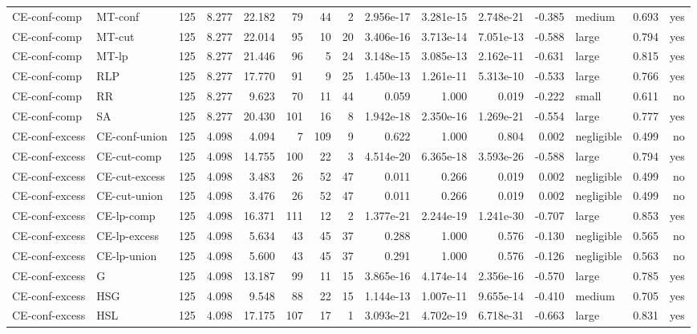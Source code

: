 \begin{table}[htbp]
\begin{tabular}{llrrrrrrrrrrlrr}
CE-conf-comp & MT-conf & 125 & 8.277 & 22.182 & 79 & 44 & 2 & 2.956e-17 & 3.281e-15 & 2.748e-21 & -0.385 & medium & 0.693 & yes \\
CE-conf-comp & MT-cut & 125 & 8.277 & 22.014 & 95 & 10 & 20 & 3.406e-16 & 3.713e-14 & 7.051e-13 & -0.588 & large & 0.794 & yes \\
CE-conf-comp & MT-lp & 125 & 8.277 & 21.446 & 96 & 5 & 24 & 3.148e-15 & 3.085e-13 & 2.162e-11 & -0.631 & large & 0.815 & yes \\
CE-conf-comp & RLP & 125 & 8.277 & 17.770 & 91 & 9 & 25 & 1.450e-13 & 1.261e-11 & 5.313e-10 & -0.533 & large & 0.766 & yes \\
CE-conf-comp & RR & 125 & 8.277 & 9.623 & 70 & 11 & 44 & 0.059 & 1.000 & 0.019 & -0.222 & small & 0.611 & no \\
CE-conf-comp & SA & 125 & 8.277 & 20.430 & 101 & 16 & 8 & 1.942e-18 & 2.350e-16 & 1.269e-21 & -0.554 & large & 0.777 & yes \\
CE-conf-excess & CE-conf-union & 125 & 4.098 & 4.094 & 7 & 109 & 9 & 0.622 & 1.000 & 0.804 & 0.002 & negligible & 0.499 & no \\
CE-conf-excess & CE-cut-comp & 125 & 4.098 & 14.755 & 100 & 22 & 3 & 4.514e-20 & 6.365e-18 & 3.593e-26 & -0.588 & large & 0.794 & yes \\
CE-conf-excess & CE-cut-excess & 125 & 4.098 & 3.483 & 26 & 52 & 47 & 0.011 & 0.266 & 0.019 & 0.002 & negligible & 0.499 & no \\
CE-conf-excess & CE-cut-union & 125 & 4.098 & 3.476 & 26 & 52 & 47 & 0.011 & 0.266 & 0.019 & 0.002 & negligible & 0.499 & no \\
CE-conf-excess & CE-lp-comp & 125 & 4.098 & 16.371 & 111 & 12 & 2 & 1.377e-21 & 2.244e-19 & 1.241e-30 & -0.707 & large & 0.853 & yes \\
CE-conf-excess & CE-lp-excess & 125 & 4.098 & 5.634 & 43 & 45 & 37 & 0.288 & 1.000 & 0.576 & -0.130 & negligible & 0.565 & no \\
CE-conf-excess & CE-lp-union & 125 & 4.098 & 5.600 & 43 & 45 & 37 & 0.291 & 1.000 & 0.576 & -0.126 & negligible & 0.563 & no \\
CE-conf-excess & G & 125 & 4.098 & 13.187 & 99 & 11 & 15 & 3.865e-16 & 4.174e-14 & 2.356e-16 & -0.570 & large & 0.785 & yes \\
CE-conf-excess & HSG & 125 & 4.098 & 9.548 & 88 & 22 & 15 & 1.144e-13 & 1.007e-11 & 9.655e-14 & -0.410 & medium & 0.705 & yes \\
CE-conf-excess & HSL & 125 & 4.098 & 17.175 & 107 & 17 & 1 & 3.093e-21 & 4.702e-19 & 6.718e-31 & -0.663 & large & 0.831 & yes \\

\end{tabular}
\end{table}
